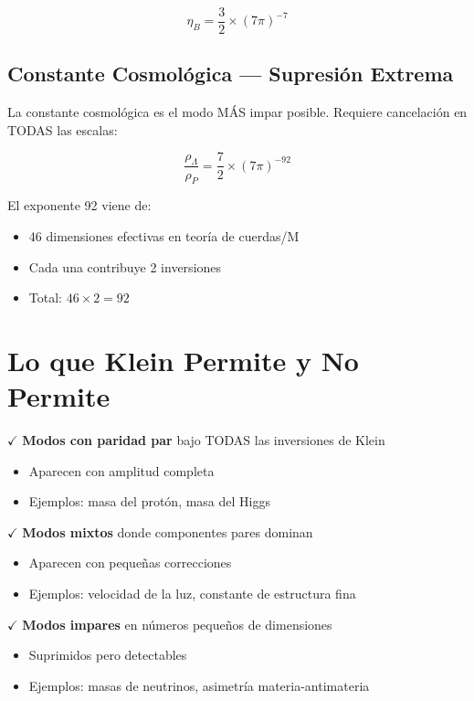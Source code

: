 \begin{equation}
\eta_B = \frac{3}{2} \times (7\pi)^{-7}
\end{equation}

\subsection{Constante Cosmológica --- Supresión Extrema}

La constante cosmológica es el modo MÁS impar posible. Requiere
cancelación en TODAS las escalas:

\begin{equation}
\frac{\rho_\Lambda}{\rho_P} = \frac{7}{2} \times (7\pi)^{-92}
\end{equation}

El exponente 92 viene de:
\begin{itemize}
    \item 46 dimensiones efectivas en teoría de cuerdas/M
    \item Cada una contribuye 2 inversiones
    \item Total: $46 \times 2 = 92$
\end{itemize}


\section{Lo que Klein Permite y No Permite}

\begin{tcolorbox}[colback=green!10, colframe=green!60!black, title=\textbf{PERMITIDO}]
$\checkmark$ \textbf{Modos con paridad par} bajo TODAS las inversiones de Klein
\begin{itemize}
    \item Aparecen con amplitud completa
    \item Ejemplos: masa del protón, masa del Higgs
\end{itemize}

$\checkmark$ \textbf{Modos mixtos} donde componentes pares dominan
\begin{itemize}
    \item Aparecen con pequeñas correcciones
    \item Ejemplos: velocidad de la luz, constante de estructura fina
\end{itemize}

$\checkmark$ \textbf{Modos impares} en números pequeños de dimensiones
\begin{itemize}
    \item Suprimidos pero detectables
    \item Ejemplos: masas de neutrinos, asimetría materia-antimateria
\end{itemize}
\end{tcolorbox}

